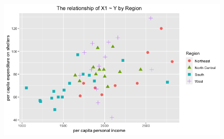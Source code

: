 \documentclass[12pt,letterpaper]{article}
\begin{document}
\begin{itemize}
\begin{figure}[h!]\centering
	\label{fig:plot_1}
	\includegraphics[width=.85\textwidth]{PS01_Q2_scplot9.png}
\end{figure}

\end{itemize}
\end{document}
